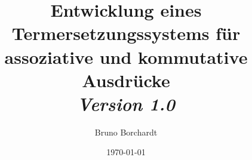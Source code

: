 \documentclass[
fancyheadings, %
%
oneside, %
%
bibliography=totoc %
]{stsreprt}
\title{Entwicklung eines Termersetzungssystems für assoziative und kommutative Ausdrücke\\ \textit{Version 1.0}}
\author{Bruno Borchardt}
\date{\today}
\numberwithin{figure}{section} %
\theoremstyle{definition} %
\begin{document}
\maketitle

\tableofcontents

\clearpage








\printglossaries

\printbibliography
\end{document}
